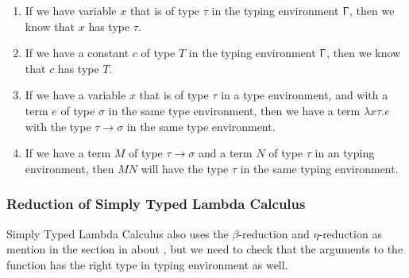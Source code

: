 \begin{enumerate}
    \item If we have variable $x$ that is of type $\tau$ in the typing environment $\Upgamma$, then we know that $x$ has type $\tau$.
    \item If we have a constant $c$ of type $T$ in the typing environment $\Upgamma$, then we know that $c$ has type $T$.
    \item If we have a variable $x$ that is of type $\tau$ in a type environment, and with a term $e$ of type $\sigma$ in the same type environment, then we have a term $\lambda x\tau .e$ with the type $\tau \rightarrow \sigma$ in the same type environment.
    \item If we have a term $M$ of type $\tau \rightarrow \sigma$ and a term $N$ of type $\tau$ in an typing environment, then $M N$ will have the type $\tau$ in the same typing environment.
\end{enumerate}

\subsubsection{Reduction of Simply Typed Lambda Calculus}
Simply Typed Lambda Calculus also uses the $\beta$-reduction and $\eta$-reduction as mention in the 
section in about , but we need to check that the arguments to the function has 
the right type in typing environment as well. 

